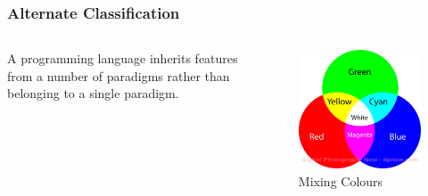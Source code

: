 \documentclass[aspectratio=1610]{beamer}
\begin{document}
\begin{frame}
\frametitle{Alternate Classification}
  \begin{columns}[T]
    \begin{column}{.7\textwidth}
     \begin{block}{}
A programming language inherits features from a number of paradigms rather than belonging to a single paradigm\cite{krishnamurthi2008teaching}.
    \end{block}
    \end{column}
    \begin{column}{.3\textwidth}
    \begin{block}{}
\begin{figure}
    \includegraphics[width=\textwidth]{colourmixing2.png} 
    \caption{Mixing Colours \cite{colourmixing}}
 \end{figure}   
    \end{block}
    \end{column}
  \end{columns}
\end{frame}
\end{document}
